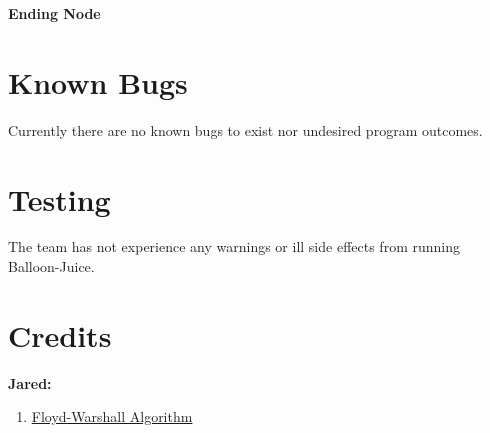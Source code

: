 \documentclass{article}
\begin{document}
\vspace*{7px}

\begin{center}
\large \textbf{Ending Node}


\end{center}

\section{Known Bugs}

Currently there are no known bugs to exist nor undesired program outcomes.

\section{Testing}

The team has not experience any warnings or ill side effects from running Balloon-Juice.

\newpage

\section{Credits}

\begin{flushleft}
\textbf{Jared:}

\begin{enumerate}
\item \href{https://en.wikipedia.org/wiki/Floyd-Warshall_algorithm}{Floyd-Warshall Algorithm}
\end{enumerate}
\end{flushleft}
\end{document}
